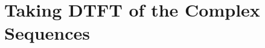\documentclass[../../course]{subfiles}
\begin{document}
\section{Taking DTFT of the Complex Sequences} \label{sec:wrkTakingDTFTCplxSeqs}
\end{document}
